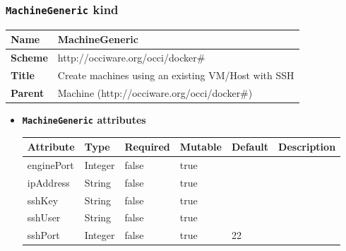 \subsubsection{\texttt{MachineGeneric} kind}
\begin{center}
\begin{tabular}{|l|l|}
  \hline
  \textbf{Name} & MachineGeneric \\
  \hline  
  \textbf{Scheme} & http://occiware.org/occi/docker\# \\
  \hline
  \textbf{Title} & Create machines using an existing VM/Host with SSH \\
  \hline
  \textbf{Parent} & Machine (http://occiware.org/occi/docker\#) \\
  \hline
\end{tabular}
\end{center}
\begin{itemize}
\item \textbf{\texttt{MachineGeneric} attributes}

\begin{tabularx}{\textwidth}{|l|l|p{1.4cm}|p{1.3cm}|l|X|}
  \hline
  \textbf{Attribute} & \textbf{Type} & \textbf{Required} & \textbf{Mutable} & \textbf{Default} & \textbf{Description} \\
  \hline  
  enginePort & Integer & false & true &  &  \\
  \hline
  ipAddress & String & false & true &  &  \\
  \hline
  sshKey & String & false & true &  &  \\
  \hline
  sshUser & String & false & true &  &  \\
  \hline
  sshPort & Integer & false & true & 22 &  \\
  \hline
\end{tabularx}
\end{itemize}



